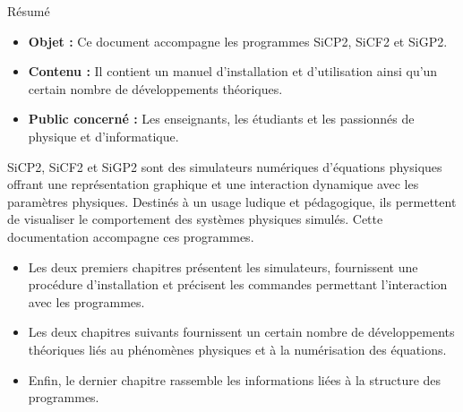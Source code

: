 \begin{center}
\Large
Résumé
\normalsize
\end{center}
\vspace{3cm}
\begin{itemize}[leftmargin=1cm, label=, itemsep=21pt]
\item {\bf Objet : }Ce document accompagne les programmes SiCP2, SiCF2 et SiGP2.
\item {\bf Contenu : }Il contient un manuel d'installation et d'utilisation ainsi qu'un certain nombre de développements théoriques.
\item {\bf Public concerné : }Les enseignants, les étudiants et les passionnés de physique et d'informatique.
\end{itemize}

\vspace{3cm}

SiCP2, SiCF2 et SiGP2 sont des simulateurs numériques d'équations physiques offrant une représentation graphique et une interaction dynamique avec les paramètres physiques. Destinés à un usage ludique et pédagogique, ils permettent de visualiser le comportement des systèmes physiques simulés. Cette documentation accompagne ces programmes.

\begin{itemize}[leftmargin=1cm, label=, itemsep=11pt]
\item Les deux premiers chapitres présentent les simulateurs, fournissent une procédure d'installation et précisent les commandes permettant l'interaction avec les programmes.
\item Les deux chapitres suivants fournissent un certain nombre de développements théoriques liés au phénomènes physiques et à la numérisation des équations.
\item Enfin, le dernier chapitre rassemble les informations liées à la structure des programmes.
\end{itemize}
